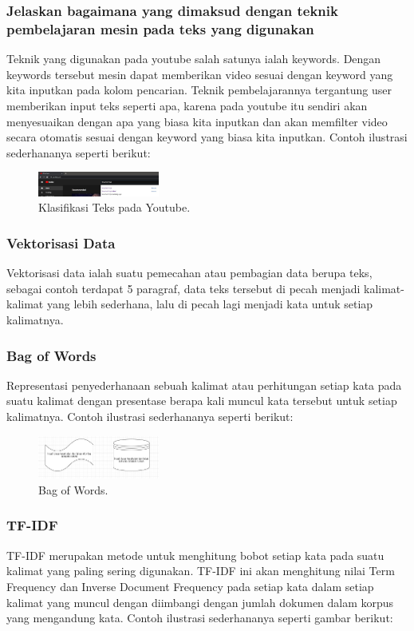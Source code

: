 \subsubsection{Jelaskan bagaimana yang dimaksud dengan teknik pembelajaran mesin pada teks yang digunakan}
\hfill\break
Teknik yang digunakan pada youtube salah satunya ialah keywords. Dengan keywords tersebut mesin dapat memberikan video sesuai dengan keyword yang kita inputkan pada kolom pencarian. Teknik pembelajarannya tergantung user memberikan input teks seperti apa, karena pada youtube itu sendiri akan menyesuaikan dengan apa yang biasa kita inputkan dan akan memfilter video secara otomatis sesuai dengan keyword yang biasa kita inputkan. Contoh ilustrasi sederhananya seperti berikut:

\begin{figure}[H]
\centering
\includegraphics[width=4cm]{figures/1174074/4/3.jpg}
\caption{Klasifikasi Teks pada Youtube.}
\end{figure}

\subsubsection{Vektorisasi Data}
\hfill\break
Vektorisasi data ialah suatu pemecahan atau pembagian data berupa teks, sebagai contoh terdapat 5 paragraf, data teks tersebut di pecah menjadi kalimat-kalimat yang lebih sederhana, lalu di pecah lagi menjadi kata untuk setiap kalimatnya. 

\subsubsection{Bag of Words}
\hfill\break
Representasi penyederhanaan sebuah kalimat atau perhitungan setiap kata pada suatu kalimat dengan presentase berapa kali muncul kata tersebut untuk setiap kalimatnya. Contoh ilustrasi sederhananya seperti berikut: 

\begin{figure}[H]
\centering
\includegraphics[width=4cm]{figures/1174074/4/4.jpg}
\caption{Bag of Words.}
\end{figure}

\subsubsection{TF-IDF}
\hfill\break
TF-IDF merupakan metode untuk menghitung bobot setiap kata pada suatu kalimat yang paling sering digunakan. TF-IDF ini akan menghitung nilai Term Frequency dan Inverse Document Frequency pada setiap kata dalam setiap kalimat yang muncul dengan diimbangi dengan jumlah dokumen dalam korpus yang mengandung kata. Contoh ilustrasi sederhananya seperti gambar berikut: 

